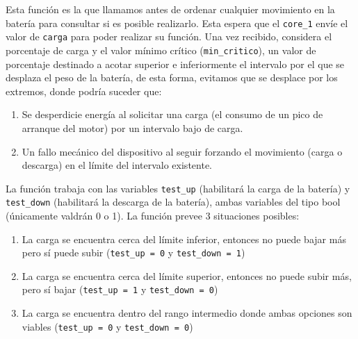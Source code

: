                    Esta función es la que llamamos antes de ordenar cualquier movimiento en la batería para consultar si es posible realizarlo. Esta espera que el \texttt{core\_1} envíe el valor de \texttt{carga} para poder realizar su función. Una vez recibido, considera el porcentaje de carga y el valor mínimo crítico (\texttt{min\_critico}), un valor de porcentaje destinado a acotar superior e inferiormente el intervalo por el que se desplaza el peso de la batería, de esta forma, evitamos que se desplace por los extremos, donde podría suceder que:\par
                    \begin{enumerate}
                    \setlength{\itemindent}{1.5em}
                    
                        \item Se desperdicie energía al solicitar una carga (el consumo de un pico de arranque del motor) por un intervalo bajo de carga.
                        \item Un fallo mecánico del dispositivo al seguir forzando el movimiento (carga o descarga) en el límite del intervalo existente.
                    \end{enumerate}
                    La función trabaja con las variables \texttt{test\_up} (habilitará la carga de la batería) y \texttt{test\_down} (habilitará la descarga de la batería), ambas variables del tipo bool (únicamente valdrán 0 o 1). La función prevee 3 situaciones posibles:\par
                    \begin{enumerate}
                    \setlength{\itemindent}{1.5em}
                    
                        \item La carga se encuentra cerca del límite inferior, entonces no puede bajar más pero sí puede subir (\texttt{test\_up = 0} y \texttt{test\_down = 1})\par
                        
                        \item La carga se encuentra cerca del límite superior, entonces no puede subir más, pero sí bajar (\texttt{test\_up = 1} y \texttt{test\_down = 0})\par
                        
                        \item La carga se encuentra dentro del rango intermedio donde ambas opciones son viables (\texttt{test\_up = 0} y \texttt{test\_down = 0})\par
                        
                    \end{enumerate}
